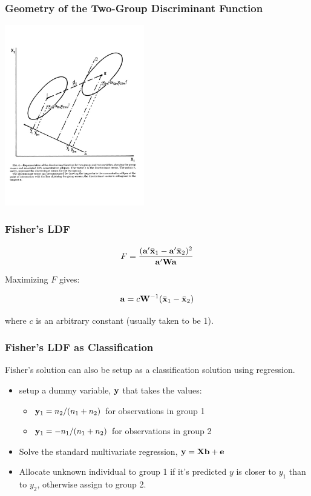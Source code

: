 \documentclass{beamer}
\begin{document}
\begin{frame}
  \frametitle{Geometry of the Two-Group Discriminant Function}
  
\begin{center}
\includegraphics[height=3.1in]{2group}
\end{center}

\end{frame}

\begin{frame}
  \frametitle{Fisher's LDF}


\[
F = \frac{(\mathbf{a}'\bar{\mathbf{x}}_1 - \mathbf{a}'\bar{\mathbf{x}}_2)^2}{\mathbf{a}'\mathbf{W}\mathbf{a}}
\]


Maximizing $F$ gives:

\[
\mathbf{a} = c\mathbf{W}^{-1}(\bar{\mathbf{x}}_1 - \bar{\mathbf{x}}_2)
\]

where $c$ is an arbitrary constant (usually taken to be 1).

\end{frame}


\begin{frame}
  \frametitle{Fisher's LDF as Classification}

Fisher's solution can also be setup as a classification solution using regression.

\begin{itemize}
\item setup a dummy variable, $\mathbf{y}$ that takes the values:
\begin{itemize}
    \item $\mathbf{y}_1 = n_2/(n_1 + n_2)$ for observations in group 1
    \item $\mathbf{y}_1 = -n_1/(n_1 + n_2)$ for observations in group 2
\end{itemize}
\item Solve the standard multivariate regression, $\mathbf{y} = \mathbf{X}\mathbf{b} + \mathbf{e}$
\item Allocate unknown individual to group 1 if it's predicted $y$ is closer to $y_1$ than to $y_2$, otherwise assign to group 2.

\end{itemize}
\end{frame}
\end{document}
